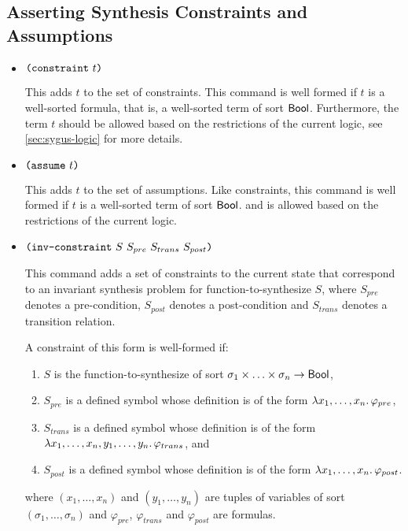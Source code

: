 \documentclass[english,a4paper,10pt]{article}
\begin{document}
\subsection{Asserting Synthesis Constraints and Assumptions}%
\label{ssec:asserting}

\begin{itemize}
\item $\texttt{(}\texttt{constraint}\mbox{ }t\texttt{)}$

This adds $t$ to the set of constraints.
This command is well formed if $t$ is a well-sorted formula,
that is, a well-sorted term of sort $\mathsf{Bool}$.
Furthermore,
the term $t$ should be allowed
based on the restrictions of the current logic,
see \cref{sec:sygus-logic} for more details.

\item $\texttt{(}\texttt{assume}\mbox{ }t\texttt{)}$

This adds $t$ to the set of assumptions.
Like constraints,
this command is well formed if $t$ is a well-sorted term of sort $\mathsf{Bool}$.
and is allowed based on the restrictions of the current logic.

\item $\texttt{(}\texttt{inv-constraint}\mbox{ }S\mbox{ }S_{pre}\mbox{ }S_{trans}\mbox{ }S_{post}\texttt{)}$

This command adds a set of constraints to the current 
state that correspond to an invariant synthesis problem for function-to-synthesize $S$,
where $S_{pre}$ denotes a pre-condition,
$S_{post}$ denotes a post-condition
and $S_{trans}$ denotes a transition relation.

A constraint of this form is well-formed if:
\begin{enumerate}
\item
$S$ is the function-to-synthesize
of sort $\sigma_1 \times \ldots \times \sigma_n \rightarrow \mathsf{Bool}$,
\item
$S_{pre}$ is a defined symbol 
whose definition is of the form $\lambda x_1, \ldots, x_n \ldotp \varphi_{pre}$,
\item
$S_{trans}$ is a defined symbol 
whose definition is of the form $\lambda x_1, \ldots, x_n, y_1, \ldots, y_n \ldotp \varphi_{trans}$, and
\item
$S_{post}$ is a defined symbol 
whose definition is of the form $\lambda x_1, \ldots, x_n \ldotp \varphi_{post}$.
\end{enumerate}
where $(x_1, \ldots, x_n)$ and $(y_1, \ldots, y_n)$
are tuples of variables of sort $(\sigma_1, \ldots, \sigma_n)$ and
$\varphi_{pre}$, $\varphi_{trans}$ and $\varphi_{post}$ are formulas.


\end{itemize}
\end{document}
